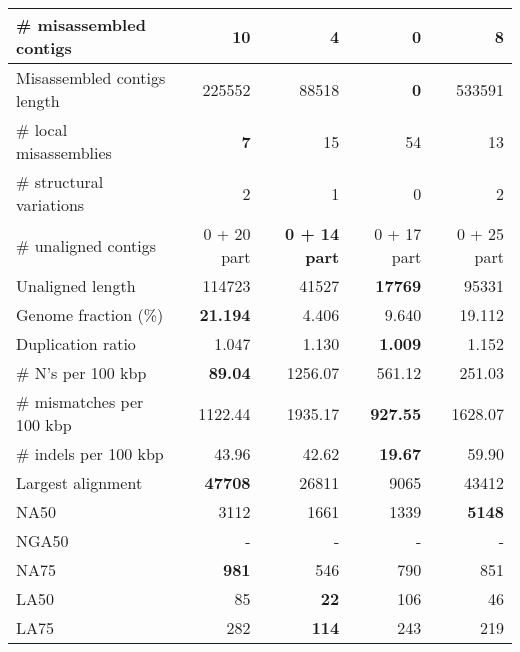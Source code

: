 \documentclass[12pt,a4paper]{article}
\begin{document}
\begin{table}[ht]
\begin{center}
\begin{tabular}{|l*{4}{|r}|}
\# misassembled contigs & 10 & 4 & {\bf 0} & 8 \\ \hline
Misassembled contigs length & 225552 & 88518 & {\bf 0} & 533591 \\ \hline
\# local misassemblies & {\bf 7} & 15 & 54 & 13 \\ \hline
\# structural variations & 2 & 1 & 0 & 2 \\ \hline
\# unaligned contigs & 0 + 20 part & {\bf 0 + 14 part} & 0 + 17 part & 0 + 25 part \\ \hline
Unaligned length & 114723 & 41527 & {\bf 17769} & 95331 \\ \hline
Genome fraction (\%) & {\bf 21.194} & 4.406 & 9.640 & 19.112 \\ \hline
Duplication ratio & 1.047 & 1.130 & {\bf 1.009} & 1.152 \\ \hline
\# N's per 100 kbp & {\bf 89.04} & 1256.07 & 561.12 & 251.03 \\ \hline
\# mismatches per 100 kbp & 1122.44 & 1935.17 & {\bf 927.55} & 1628.07 \\ \hline
\# indels per 100 kbp & 43.96 & 42.62 & {\bf 19.67} & 59.90 \\ \hline
Largest alignment & {\bf 47708} & 26811 & 9065 & 43412 \\ \hline
NA50 & 3112 & 1661 & 1339 & {\bf 5148} \\ \hline
NGA50 & - & - & - & - \\ \hline
NA75 & {\bf 981} & 546 & 790 & 851 \\ \hline
LA50 & 85 & {\bf 22} & 106 & 46 \\ \hline
LA75 & 282 & {\bf 114} & 243 & 219 \\ \hline
\end{tabular}
\end{center}
\end{table}
\end{document}
